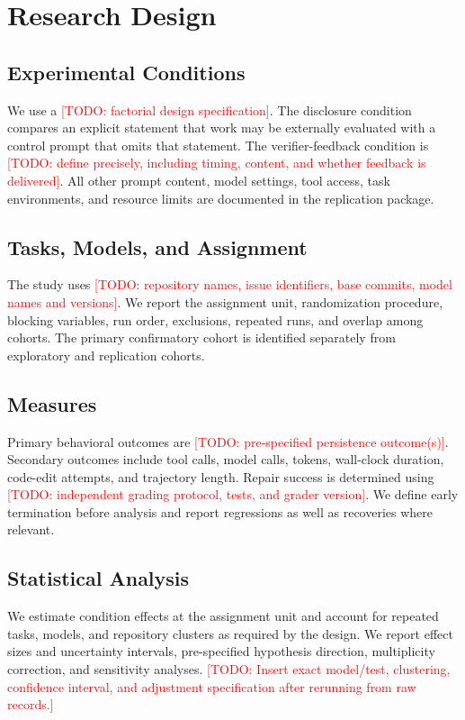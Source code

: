 \documentclass[journal]{IEEEtran}
\newcommand{\TODO}[1]{\textcolor{red}{[TODO: #1]}}
\begin{document}
\section{Research Design}
\subsection{Experimental Conditions}
We use a \TODO{factorial design specification}. The disclosure condition compares an explicit statement that work may be externally evaluated with a control prompt that omits that statement. The verifier-feedback condition is \TODO{define precisely, including timing, content, and whether feedback is delivered}. All other prompt content, model settings, tool access, task environments, and resource limits are documented in the replication package.

\subsection{Tasks, Models, and Assignment}
The study uses \TODO{repository names, issue identifiers, base commits, model names and versions}. We report the assignment unit, randomization procedure, blocking variables, run order, exclusions, repeated runs, and overlap among cohorts. The primary confirmatory cohort is identified separately from exploratory and replication cohorts.

\subsection{Measures}
Primary behavioral outcomes are \TODO{pre-specified persistence outcome(s)}. Secondary outcomes include tool calls, model calls, tokens, wall-clock duration, code-edit attempts, and trajectory length. Repair success is determined using \TODO{independent grading protocol, tests, and grader version}. We define early termination before analysis and report regressions as well as recoveries where relevant.

\subsection{Statistical Analysis}
We estimate condition effects at the assignment unit and account for repeated tasks, models, and repository clusters as required by the design. We report effect sizes and uncertainty intervals, pre-specified hypothesis direction, multiplicity correction, and sensitivity analyses. \TODO{Insert exact model/test, clustering, confidence interval, and adjustment specification after rerunning from raw records.}
\end{document}
